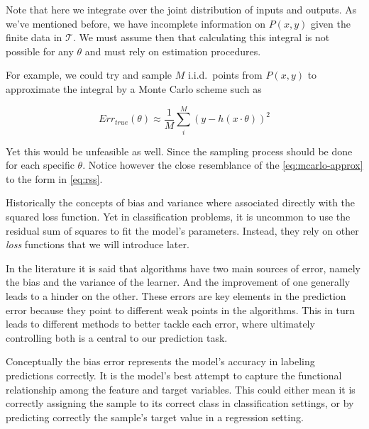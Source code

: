 Note that here we integrate over the joint distribution of inputs and outputs.
As we've mentioned before, we have incomplete information on $P(x,y)$ given the finite data in $\mathcal{T}$.
We must assume then that calculating this integral is not possible for any $\theta$ and must rely on estimation procedures.

For example, we could try and sample $M$ i.i.d.\ points from $P(x,y)$ to approximate the integral by a Monte Carlo scheme such as

\begin{equation}\label{eq:mcarlo-approx}
Err_{true}(\theta) \approx \frac{1}{M} \sum_i^M {( y - h(x \cdot \theta) )}^2
\end{equation}

Yet this would be unfeasible as well.
Since the sampling process should be done for each specific $\theta$.
Notice however the close resemblance of the \cref{eq:mcarlo-approx} to the form in \cref{eq:rss}.

Historically the concepts of bias and variance where associated directly with the squared loss function.
 Yet in classification problems, it is uncommon to use the residual sum of squares to fit the model's parameters.
Instead, they rely on other \textit{loss} functions that we will introduce later.

%


In the literature it is said that algorithms have two main sources of error, namely the bias and the variance of the learner.
And the improvement of one generally leads to a hinder on the other.
These errors are key elements in the prediction error because they point to different weak points in the algorithms.
This in turn leads to different methods to better tackle each error, where ultimately controlling both is a central to our prediction task.

Conceptually the bias error represents the model's accuracy in labeling predictions correctly.
It is the model's best attempt to capture the functional relationship among the feature and target variables.
This could either mean it is correctly assigning the sample to its correct class in classification settings, or by predicting correctly the sample's target value in a regression setting.

